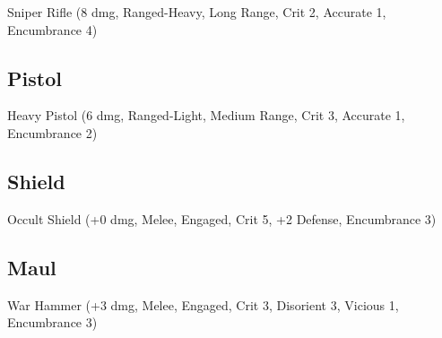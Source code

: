 \documentclass{book}
\begin{document}
\begin{multicols}{2}
Sniper Rifle (8 dmg, Ranged-Heavy, Long Range, Crit 2, Accurate 1, Encumbrance 4)

\subsection{Pistol}

Heavy Pistol (6 dmg, Ranged-Light, Medium Range, Crit 3, Accurate 1, Encumbrance 2)

\subsection{Shield}

Occult Shield (+0 dmg, Melee, Engaged, Crit 5, +2 Defense, Encumbrance 3)

\subsection{Maul}

War Hammer (+3 dmg, Melee, Engaged, Crit 3, Disorient 3, Vicious 1, Encumbrance 3)



\end{multicols}
\end{document}

